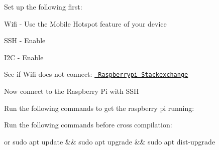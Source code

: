Set up the following first\+:


\begin{DoxyItemize}
\item Wifi -\/ Use the Mobile Hotspot feature of your device
\item SSH -\/ Enable
\item I2C -\/ Enable
\end{DoxyItemize}

See if Wifi does not connect\+: \href{https://raspberrypi.stackexchange.com/questions/96736}{\texttt{ Raspberrypi Stackexchange}}

Now connect to the Raspberry Pi with SSH

Run the following commands to get the raspberry pi running\+: 
\begin{DoxyCode}{0}

\end{DoxyCode}


Run the following commands before cross compilation\+: 
\begin{DoxyCode}{0}

\end{DoxyCode}
 or {\ttfamily sudo apt update \&\& sudo apt upgrade \&\& sudo apt dist-\/upgrade} 
